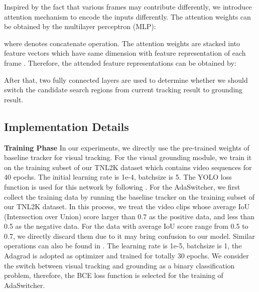 \documentclass[final]{cvpr}
\begin{document}
Inspired by the fact that various frames may contribute differently, we introduce attention mechanism to encode the inputs differently. The attention weights  can be obtained by the multilayer perceptron (MLP): 

where  denotes concatenate operation. The attention weights  are stacked into feature vectors  which have same dimension with feature representation  of each frame . Therefore, the attended feature representations can be obtained by:  

After that, two fully connected layers are used to determine whether we should switch the candidate search regions from current tracking result to grounding result.  



\subsection{Implementation Details} 
\textbf{Training Phase} 
In our experiments, we directly use the pre-trained weights of baseline tracker for visual tracking. For the visual grounding module, we train it on the training subset of our TNL2K dataset which contains  video sequences  for 40 epochs. The initial learning rate is 1e-4, batchsize is 5. The YOLO loss function is used for this network by following \cite{redmon2018yolov3, yang2019fastgrounding}. For the AdaSwitcher, we first collect the training data by running the baseline tracker on the training subset of our TNL2K dataset. In this process, we treat the video clips whose average IoU (Intersection over Union) score larger than 0.7 as the positive data, and less than 0.5 as the negative data. For the data with average IoU score range from 0.5 to 0.7, we directly discard them due to it may bring confusion to our model. Similar operations can also be found in \cite{Jung_2018_ECCV}. The learning rate is 1e-5, batchsize is 1, the Adagrad \cite{duchi2011adagrad} is adopted as optimizer and trained for totally 30 epochs. We consider the switch between visual tracking and grounding as a binary classification problem, therefore, the BCE loss function is selected for the training of AdaSwitcher. 
\end{document}
